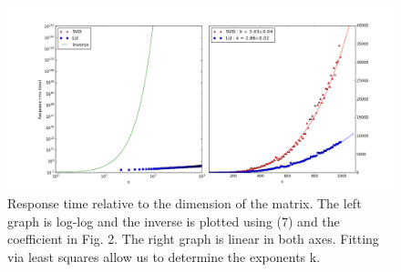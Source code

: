 \documentclass[10 pt]{article}
\begin{document}
\begin{figure}[H]
\includegraphics[width = \linewidth]{SVD_LU_inverse}
\caption{Response time relative to the dimension of the matrix. The left graph is log-log and the inverse is plotted using (7) and the coefficient in Fig. 2. The right graph is linear in both axes. Fitting via least squares allow us to determine the exponents k.}
\end{figure}
\end{document}
